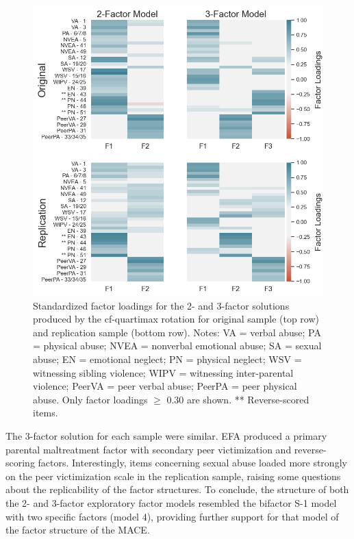 \documentclass[letterpaper,man,natbib,noextraspace,floatsintext,longtable]{apa6}
\begin{document}
\begin{figure}[t!]
    \centering
    \includegraphics[width=1\textwidth,center]{figures/fig04.png}
    \caption{\normalfont Standardized factor loadings for the 2- and 3-factor solutions produced by the cf-quartimax rotation for original sample (top row) and replication sample (bottom row). \break \small Notes: VA = verbal abuse; PA = physical abuse; NVEA = nonverbal emotional abuse; SA = sexual abuse; EN = emotional neglect; PN = physical neglect; WSV = witnessing sibling violence; WIPV = witnessing inter-parental violence; PeerVA = peer verbal abuse; PeerPA = peer physical abuse. Only factor loadings $\geq$ 0.30 are shown. ** Reverse-scored items.}
    \label{fig:efa_cf}
\end{figure}

The 3-factor solution for each sample were similar. EFA produced a primary parental maltreatment factor with secondary peer victimization and reverse-scoring factors. Interestingly, items concerning sexual abuse loaded more strongly on the peer victimization scale in the replication sample, raising some questions about the replicability of the factor structures. To conclude, the structure of both the 2- and 3-factor exploratory factor models resembled the bifactor S-1 model with two specific factors (model 4), providing further support for that model of the factor structure of the MACE. 
\end{document}
